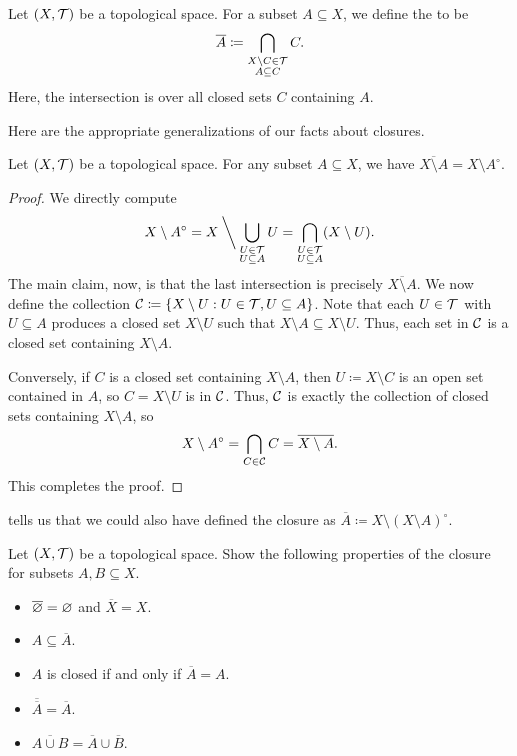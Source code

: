 \documentclass[../main.tex]{subfiles}
\begin{document}
\begin{definition}[closure]
    Let $(X,\mathcal{T})$ be a topological space. For a subset $A\subseteq X$, we define the  to be
    \[\overline A\coloneqq\bigcap_{\substack{X\setminus C\in\mathcal{T}\\A\subseteq C}}C.\]
    Here, the intersection is over all closed sets $C$ containing $A$.
\end{definition}
Here are the appropriate generalizations of our facts about closures.
\begin{proposition} \label{prop:cl-by-int}
    Let $(X,\mathcal{T})$ be a topological space. For any subset $A\subseteq X$, we have $\overline{X\setminus A}=X\setminus A^\circ$.
\end{proposition}
\begin{proof}
    We directly compute
    \[X\setminus A^\circ=X\mathbin{\bigg\backslash}\bigcup_{\substack{U\in\mathcal{T}\\U\subseteq A}}U=\bigcap_{\substack{U\in\mathcal{T}\\U\subseteq A}}(X\setminus U).\]
    The main claim, now, is that the last intersection is precisely $\overline{X\setminus A}$. We now define the collection $\mathcal{C}\coloneqq\{X\setminus U:U\in\mathcal{T},U\subseteq A\}$. Note that each $U\in\mathcal{T}$ with $U\subseteq A$ produces a closed set $X\setminus U$ such that $X\setminus A\subseteq X\setminus U$. Thus, each set in $\mathcal{C}$ is a closed set containing $X\setminus A$.
    
    Conversely, if $C$ is a closed set containing $X\setminus A$, then $U\coloneqq X\setminus C$ is an open set contained in $A$, so $C=X\setminus U$ is in $\mathcal{C}$. Thus, $\mathcal{C}$ is exactly the collection of closed sets containing $X\setminus A$, so
    \[X\setminus A^\circ=\bigcap_{C\in\mathcal{C}}C=\overline{X\setminus A}.\]
    This completes the proof.
\end{proof}
\begin{remark}
     tells us that we could also have defined the closure as $\overline A\coloneqq X\setminus(X\setminus A)^\circ$.
\end{remark}
\begin{exe}
    Let $(X,\mathcal{T})$ be a topological space. Show the following properties of the closure for subsets $A,B\subseteq X$.
    \begin{itemize}
        \item $\overline{\varnothing}=\varnothing$ and $\overline X=X$.
        \item $A\subseteq\overline A$.
        \item $A$ is closed if and only if $\overline A=A$.
        \item $\overline{\overline A}=\overline A$.
        \item $\overline{A\cup B}=\overline A\cup\overline B$.
    \end{itemize}
\end{exe}
\end{document}
